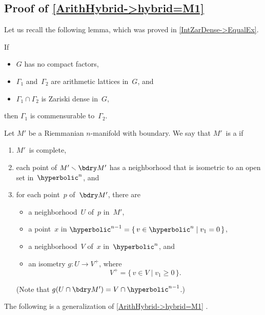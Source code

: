 \subsection{Proof of \cref{ArithHybrid->hybrid=M1}}
 \label{ArithHybrid->Cup=M1Pf}

Let us recall the following lemma, which was proved in
\cref{IntZarDense->EqualEx}.

\begin{lem} \label{IntZarDense->Equal}
 If 
 \begin{itemize}
 \item $G$ has no compact factors,
 \item $\Gamma_1$ and~$\Gamma_2$ are arithmetic lattices
in~$G$, and
 \item $\Gamma_1 \cap \Gamma_2$ is Zariski dense in~$G$,
 \end{itemize}
 then $\Gamma_1$ is commensurable to~$\Gamma_2$.
 \end{lem}

\begin{defn}
 Let $M'$ be a Riemmanian $n$-manifold with boundary. We say
that $M'$~is a  if 
 \begin{enumerate}
 \item $M'$~is complete,
 \item each point of $M' \smallsetminus \bdry M'$ has a
neighborhood that is isometric to an open set
in~$\hyperbolic^n$, and
 \item for each point~$p$ of~$\bdry M'$, there are
 \begin{itemize}
 \item a neighborhood~$U$ of~$p$ in~$M'$,
 \item a point~$x$ in $\hyperbolic^{n-1} = \{\, v \in
\hyperbolic^n \mid v_1 = 0 \,\}$,
 \item a neighborhood~$V$ of~$x$ in~$\hyperbolic^n$, and
 \item an isometry $g \colon U \to V^+$, where 
 $$ V^+ = \{\, v \in V \mid v_1 \ge 0 \,\} .$$
 \end{itemize}
 (Note that $g(U \cap \bdry M') = V \cap
\hyperbolic^{n-1}$.)
 \end{enumerate}
 \end{defn}

The following is a generalization of
\cref{ArithHybrid->hybrid=M1}  .

